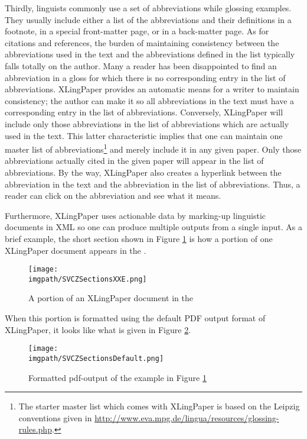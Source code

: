 Thirdly, linguists commonly use a set of abbreviations while glossing examples. They usually include either a list of the abbreviations and their definitions in a footnote, in a special front-matter page, or in a back-matter page. As for citations and references, the burden of maintaining consistency between the abbreviations used in the text and the abbreviations defined in the list typically falls totally on the author. Many a reader has been disappointed to find an abbreviation in a gloss for which there is no corresponding entry in the list of abbreviations. XLingPaper provides an automatic means for a writer to maintain consistency; the author can make it so all abbreviations in the text must have a corresponding entry in the list of abbreviations. Conversely, XLingPaper will include only those abbreviations in the list of abbreviations which are actually used in the text. This latter characteristic implies that one can maintain one master list of abbreviations\footnote{\label{nLeipzig}
   The starter master list which comes with XLingPaper is based on the Leipzig conventions given in  \url{http://www.eva.mpg.de/lingua/resources/glossing-rules.php}.
} 
and merely include it in any given paper. Only those abbreviations actually cited in the given paper will appear in the list of abbreviations. By the way, XLingPaper also creates a hyperlink between the abbreviation in the text and the abbreviation in the list of abbreviations. Thus, a reader can click on the abbreviation and see what it means.

Furthermore, XLingPaper  uses actionable data by marking-up linguistic documents in XML so one can produce multiple outputs from a single input.  As a brief example, the short section shown in Figure \ref{xSVCZSectionsXXE} is how a portion of one XLingPaper document appears in the {\XMLmindXMLEditor}.

\begin{figure}[h]
\texttt{[image: \\imgpath/SVCZSectionsXXE.png]}
\caption{A portion of an XLingPaper document in the {\XMLmindXMLEditor}}
  \label{xSVCZSectionsXXE}%
\end{figure}

When this portion is formatted using the default PDF output format of XLingPaper, it looks like what is given in Figure \ref{xSVCZSectionsDefault}.
  
\begin{figure}[h]
\texttt{[image: \\imgpath/SVCZSectionsDefault.png]}
\caption{Formatted pdf-output of the example in Figure \ref{xSVCZSectionsXXE}}
 \label{xSVCZSectionsDefault}%
\end{figure}


